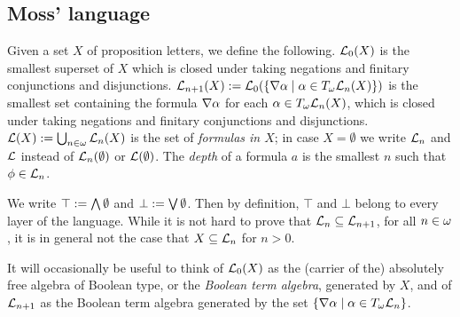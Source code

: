 \documentclass{book}
\begin{document}
\subsection*{Moss' language}

\begin{definition}\label{def:moss-lang}
Given a set $X$ of proposition letters, we define the
following.  $\mathcal{L}_{0}(X)$ is the smallest superset of $X$ which is
closed under taking negations and finitary conjunctions and
disjunctions.
$\mathcal{L}_{n+1}(X):= \mathcal{L}_{0}(\{ \nabla\alpha \mid \alpha \in
T_{\omega}\mathcal{L}_{n}(X)\})$ is the smallest set containing the formula
$\nabla\alpha$ for each $\alpha \in T_{\omega}\mathcal{L}_{n}(X)$, which is closed
under taking negations and finitary conjunctions and disjunctions.
$\mathcal{L}(X) := \bigcup_{n \in \omega} \mathcal{L}_{n}(X)$ is the set of
\emph{formulas in $X$}; in case $X = \emptyset$ we write $\mathcal{L}_{n}$
and $\mathcal{L}$ instead of $\mathcal{L}_{n}(\emptyset)$ or $\mathcal{L}(\emptyset)$.
The \emph{depth} of a formula $a$ is the smallest $n$ such that $\phi
\in \mathcal{L}_{n}$.
\end{definition}

We write $\top := \bigwedge\emptyset$ and $\bot := \bigvee\emptyset$.  Then by
definition, $\top$ and $\bot$ belong to every layer of the language.
While it is not hard to prove that $\mathcal{L}_{n} \subseteq \mathcal{L}_{n+1}$,
for all $n \in \omega$, it is in general not the case that $X \subseteq
\mathcal{L}_{n}$ for $n>0$.

It will occasionally be useful to think of $\mathcal{L}_{0}(X)$ as the
(carrier of the) absolutely free algebra of Boolean type, or the
\emph{Boolean term algebra}, generated by $X$, and of $\mathcal{L}_{n+1}$ as
the Boolean term algebra generated by the set $\{ \nabla\alpha \mid
\alpha \in T_{\omega}\mathcal{L}_{n} \}$.

\end{document}
